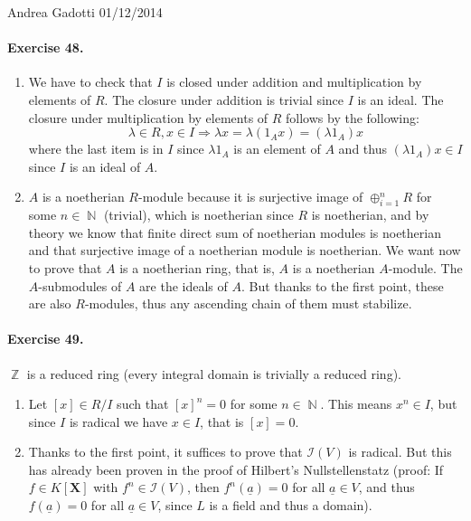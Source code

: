 \documentclass[12pt,a4paper]{report}
\theoremstyle{definition}
\theoremstyle{num.custom-title}
\DeclareMathOperator{\N}{\mathbb{N}}
\DeclareMathOperator{\Z}{\mathbb{Z}}
\DeclareMathOperator{\imp}{\Rightarrow}
\newcommand{\ul}{\underline}
\begin{document}
\noindent Andrea Gadotti \hfill 01/12/2014

\paragraph{Exercise 48.}
\begin{enumerate}
\item We have to check that $I$ is closed under addition and multiplication by elements of $R$. The closure under addition is trivial since $I$ is an ideal. The closure under multiplication by elements of $R$ follows by the following:
\[
\lambda \in R, x \in I \imp \lambda x = \lambda (1_A x) = (\lambda 1_A) x
\]
where the last item is in $I$ since $\lambda 1_A$ is an element of $A$ and thus $(\lambda 1_A) x \in I$ since $I$ is an ideal of $A$.
\item $A$ is a noetherian $R$-module because it is surjective image of $\oplus_{i=1}^n R$ for some $n \in \N$ (trivial), which is noetherian since $R$ is noetherian, and by theory we know that finite direct sum of noetherian modules is noetherian and that surjective image of a noetherian module is noetherian. We want now to prove that $A$ is a noetherian ring, that is, $A$ is a noetherian $A$-module. The $A$-submodules of $A$ are the ideals of $A$. But thanks to the first point, these are also $R$-modules, thus any ascending chain of them must stabilize.
\end{enumerate}

\paragraph{Exercise 49.} $\Z$ is a reduced ring (every integral domain is trivially a reduced ring).
\begin{enumerate}
\item Let $[x] \in R/I$ such that $[x]^n=0$ for some $n \in \N$. This means $x^n \in I$, but since $I$ is radical we have $x \in I$, that is $[x]=0$.
\item Thanks to the first point, it suffices to prove that $\mathcal{I}(V)$ is radical. But this has already been proven in the proof of Hilbert's Nullstellenstatz (proof: If $f \in K[\mathbf{X}]$ with $f^n \in \mathcal{I}(V)$, then $f^n(\ul{a})=0$ for all $\ul{a} \in V$, and thus $f(\ul{a})=0$ for all $\ul{a} \in V$, since $L$ is a field and thus a domain).
\end{enumerate}
\end{document}
